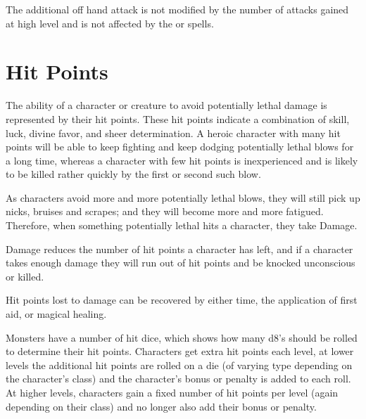 \begin{multicols*}{2}
The additional off hand attack is not modified by the number of attacks gained at high level and is not affected by the  or  spells.


\section{Hit Points}\label{sec:Hit Points}
The ability of a character or creature to avoid potentially lethal damage is represented by their hit points. These hit points indicate a combination of skill, luck, divine favor, and sheer determination. A heroic character with many hit points will be able to keep fighting and keep dodging potentially lethal blows for a long time, whereas a character with few hit points is inexperienced and is likely to be killed rather quickly by the first or second such blow.

As characters avoid more and more potentially lethal blows, they will still pick up nicks, bruises and scrapes; and they will become more and more fatigued. Therefore, when something potentially lethal hits a character, they take Damage.

Damage reduces the number of hit points a character has left, and if a character takes enough damage they will run out of hit points and be knocked unconscious or killed.

Hit points lost to damage can be recovered by either time, the application of first aid, or magical healing.

Monsters have a number of hit dice, which shows how many d8’s should be rolled to determine their hit points. Characters get extra hit points each level, at lower levels the additional hit points are rolled on a die (of varying type depending on the character’s class) and the character’s  bonus or penalty is added to each roll. At higher levels, characters gain a fixed number of hit points per level (again depending on their class) and no longer also add their  bonus or penalty.


\end{multicols*}
